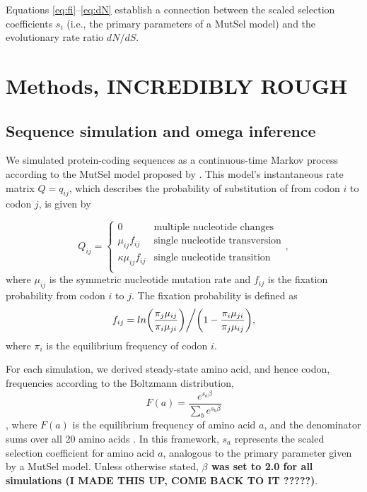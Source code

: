 \documentclass[11pt]{article}
\begin{document}
Equations \eqref{eq:fi}--\eqref{eq:dN} establish a connection between the scaled selection coefficients $s_i$ (i.e., the primary parameters of a MutSel model) and the evolutionary rate ratio $dN/dS$. 



\section*{Methods, INCREDIBLY ROUGH}

\subsection*{Sequence simulation and omega inference}
We simulated protein-coding sequences as a continuous-time Markov
process \cite{Yang2006} according to the MutSel model proposed by \cite{HalpernBruno1998}. This model's instantaneous rate matrix $Q = q_{ij}$, which describes the probability of substitution of from codon $i$ to codon $j$, is given by 

\begin{equation}
Q_{ij} = \left\{ \begin{array}{rl}
              0                                           &\mbox{multiple nucleotide changes} \\
              \mu_{ij}f_{ij}                          &\mbox{single nucleotide transversion} \\
              \kappa\mu_{ij}f_{ij}               &\mbox{single nucleotide transition} \\
         \end{array} \right.,
\end{equation} where $\mu_{ij}$ is the symmetric nucleotide mutation rate and $f_{ij}$ is the fixation probability from codon $i$ to $j$. The fixation probability is defined as \begin{equation}f_{ij} = ln\bigg{(}\frac{\pi_j\mu_{ij}}{\pi_i\mu_{ji}}\bigg{)}\bigg{/}\bigg{(}1 - \frac{\pi_i\mu_{ji}}{\pi_j\mu_{ij}}\bigg{)},\end{equation} where $\pi_i$ is the equilibrium frequency of codon $i$.

For each simulation, we derived steady-state amino acid, and hence codon, frequencies according to the Boltzmann distribution,
\begin{equation} F(a) = \frac{e^{s_a\beta}}{\sum_b e^{s_b\beta}} \end{equation}, where $F(a)$ is the equilibrium frequency of amino acid $a$, and the denominator sums over all 20 amino acids \cite{SellaHirsh2005, Ramseyetal2011}. In this framework, $s_a$ represents the scaled selection coefficient for amino acid $a$, analogous to the primary parameter given by a MutSel model. Unless otherwise stated, \textbf{$\beta$ was set to 2.0 for all simulations (I MADE THIS UP, COME BACK TO IT ?????)}. 
  
\end{document}

